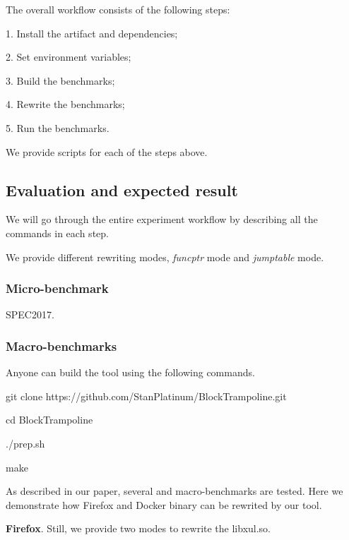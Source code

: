 \documentclass{sigplanconf}
\begin{document}
{The overall workflow consists of the following steps:

1. Install the artifact and dependencies;

2. Set environment variables;

3. Build the benchmarks;

4. Rewrite the benchmarks;

5. Run the benchmarks.

We provide scripts for each of the steps above.

\subsection{Evaluation and expected result}


We will go through the entire experiment workflow by describing all the commands in each step.

We provide different rewriting modes, \textit{funcptr} mode and \textit{jumptable} mode.






\subsubsection{Micro-benchmark}

SPEC2017.

\subsubsection{Macro-benchmarks}


Anyone can build the tool using the following commands.

git clone https://github.com/StanPlatinum/BlockTrampoline.git

cd BlockTrampoline


./prep.sh

make



As described in our paper, several and macro-benchmarks are tested. Here we demonstrate how Firefox and Docker binary can be rewrited by our tool.

\vspace{2pt}\noindent\textbf{Firefox}. Still, we provide two modes to rewrite the libxul.so.

}
\end{document}
